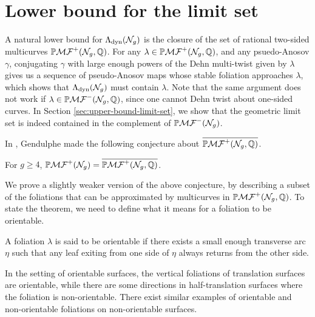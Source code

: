 \documentclass[12pt, reqno]{amsart}
\begin{document}
\section{Lower bound for the limit set}
\label{sec:lower-bound-limit-set}

A natural lower bound for $\Lambda_{\mathrm{dyn}}(\mathcal{N}_g)$ is the closure of the set of rational two-sided multicurves $\mathbb{P}\mathcal{MF}^+(\mathcal{N}_g, \mathbb{Q})$.
For any $\lambda \in \mathbb{P}\mathcal{MF}^+(\mathcal{N}_g, \mathbb{Q})$, and any psuedo-Anosov $\gamma$, conjugating $\gamma$ with large enough powers of the Dehn multi-twist given by $\lambda$ gives us a sequence of pseudo-Anosov maps whose stable foliation approaches $\lambda$, which shows that $\Lambda_{\mathrm{dyn}}(\mathcal{N}_g)$ must contain $\lambda$.
Note that the same argument does not work if $\lambda \in \mathbb{P}\mathcal{MF}^-(\mathcal{N}_g, \mathbb{Q})$, since one cannot Dehn twist about one-sided curves.
In Section \ref{sec:upper-bound-limit-set}, we show that the geometric limit set is indeed contained in the complement of $\mathbb{P}\mathcal{MF}^-(\mathcal{N}_g)$.

In \cite{gendulphe_whats_2017}, Gendulphe made the following conjecture about $\overline{\mathbb{P}\mathcal{MF}^+(\mathcal{N}_g, \mathbb{Q})}$.
\begin{conjecture}
  \label{conj:gendulphe-1}
  For $g \geq 4$, $\mathbb{P}\mathcal{MF}^+(\mathcal{N}_g) = \overline{\mathbb{P}\mathcal{MF}^+(\mathcal{N}_g, \mathbb{Q})}$.
\end{conjecture}
We prove a slightly weaker version of the above conjecture, by describing a subset of the foliations that can be approximated by multicurves in $\mathbb{P}\mathcal{MF}^+(\mathcal{N}_g, \mathbb{Q})$.
To state the theorem, we need to define what it means for a foliation to be orientable.
\begin{definition}
  A foliation $\lambda$ is said to be orientable if there exists a small enough transverse arc $\eta$ such that any leaf exiting from one side of $\eta$ always returns from the other side.
\end{definition}
In the setting of orientable surfaces, the vertical foliations of translation surfaces are orientable, while there are some directions in half-translation surfaces where the foliation is non-orientable.
There exist similar examples of orientable and non-orientable foliations on non-orientable surfaces.
\end{document}
